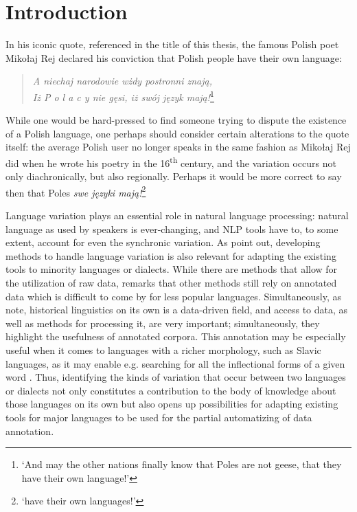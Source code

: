 \section{Introduction}
\label{sec:intro}

In his iconic quote, referenced in the title of this thesis, the famous Polish poet Mikołaj Rej declared his conviction that Polish people have their own language: 

\begin{quote}
\centering
   \textit{A niechaj narodowie wżdy postronni znają, \\
    Iż P o l a c y nie gęsi, iż swój język mają!}\footnote{ `And may the other nations finally know that Poles are not geese, that they have their own language!'} \\
\raggedleft
\citet{mikołaj_rej}
\end{quote}

While one would be hard-pressed to find someone trying to dispute the existence of a Polish language, one perhaps should consider certain alterations to the quote itself: the average Polish user no longer speaks in the same fashion as Mikołaj Rej did when he wrote his poetry in the 16\textsuperscript{th} century, and the variation occurs not only diachronically, but also regionally. Perhaps it would be more correct to say then that Poles \textit{swe języki mają!}\footnote{ `have their own languages!'}

Language variation plays an essential role in natural language processing: natural language as used by speakers is ever-changing, and NLP tools have to, to some extent, account for even the synchronic variation. As \citet{Zampieri2020NaturalLP} point out, developing methods to handle language variation is also relevant for adapting the existing tools to minority languages or dialects. While there are methods that allow for the utilization of raw data, \citet{ponti_2019} remarks that other methods still rely on annotated data which is difficult to come by for less popular languages. Simultaneously, as \citet{quantitative-historical} note, historical linguistics on its own is a data-driven field, and access to data, as well as methods for processing it, are very important; simultaneously, they highlight the usefulness of annotated corpora. This annotation may be especially useful when it comes to languages with a richer morphology, such as Slavic languages, as it may enable e.g. searching for all the inflectional forms of a given word \citep{pęzik_2012}. Thus, identifying the kinds of variation that occur between two languages or dialects not only constitutes a contribution to the body of knowledge about those languages on its own but also opens up possibilities for adapting existing tools for major languages to be used for the partial automatizing of data annotation. 

